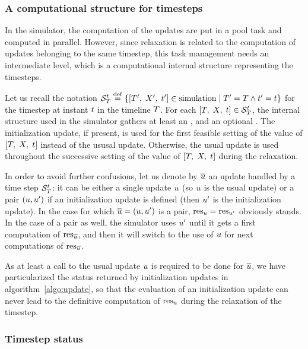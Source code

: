 \subsubsection{A computational structure for timesteps}

In the simulator, the computation of the updates are put in a pool task and computed in parallel. However, since relaxation is related to the computation of updates belonging to the same timestep, this task management needs an intermediate level, which is a computational internal structure representing the timesteps.

Let us recall the notation ${{{\cal S}}_{T}^{t}}\;{\stackrel{\mathrm{def}}{=}}\;{\left\{{\left[ T',\;X',\;t' \right]} \in {\mbox{simulation}}\; \middle| \; {{T'} = {T}} \wedge {{t'} = {t}}\right\}}$ for the timestep at instant $t$ in the timeline $T$. For each ${\left[ T,\;X,\;t \right]} \in {{{\cal S}}_{T}^{t}}$, the internal structure used in the simulator gathers at least an , and an optional . The initialization update, if present, is used for the first feasible setting of the value of $\left[ T,\;X,\;t \right]$ instead of the ususal update. Otherwise, the usual update is used throughout the successive setting of the value of $\left[ T,\;X,\;t \right]$ during the relaxation.


In order to avoid further confusions, let us denote by $\overline{u}$ an update handled by a time step ${{\cal S}}_{T}^{t}$: it can be either a single update $u$ (so $u$ is the usual update) or a pair $\left(u,u'\right)$ if an initialization update is defined (then $u'$ is the initialization update). In the case for which ${\overline{u}} = {\left(u,u'\right)}$ is a pair, ${{\mathrm{res}}_{u}} = {{\mathrm{res}}_{u'}}$ obviously stands. In the case of a pair as well, the simulator uses $u'$ until it gets a first computation of ${\mathrm{res}}_{\overline{u}}$, and then it will switch to the use of $u$ for next computations of ${\mathrm{res}}_{\overline{u}}$.

As at least a call to the usual update $u$ is required to be done for $\overline{u}$, we have particularized the status returned by initialization updates in algorithm~\ref{algo:update}, so that the evaluation of an initialization update can never lead to the definitive computation of ${\mathrm{res}}_{u}$ during the relaxation of the timestep.

\subsubsection{Timestep status}

